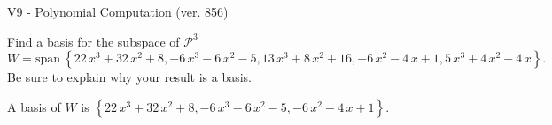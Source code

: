 \begin{exercise}
  \begin{exerciseTitle}V9 - Polynomial Computation (ver. 856)\end{exerciseTitle}
  \begin{exerciseStatement}
    Find a basis for the subspace of \(\mathcal{P}^3\) 
\[W=\mathrm{span}\ \left\{22 \, x^{3} + 32 \, x^{2} + 8 , -6 \, x^{3} - 6 \, x^{2} - 5 , 13 \, x^{3} + 8 \, x^{2} + 16 , -6 \, x^{2} - 4 \, x + 1 , 5 \, x^{3} + 4 \, x^{2} - 4 \, x\right\}.\]
 Be sure to explain why your result is a basis.


  \end{exerciseStatement}
  \begin{exerciseAnswer}
   A basis of \(W\) is  \(\left\{22 \, x^{3} + 32 \, x^{2} + 8 , -6 \, x^{3} - 6 \, x^{2} - 5 , -6 \, x^{2} - 4 \, x + 1\right\}\).
  


  \end{exerciseAnswer}
\end{exercise}